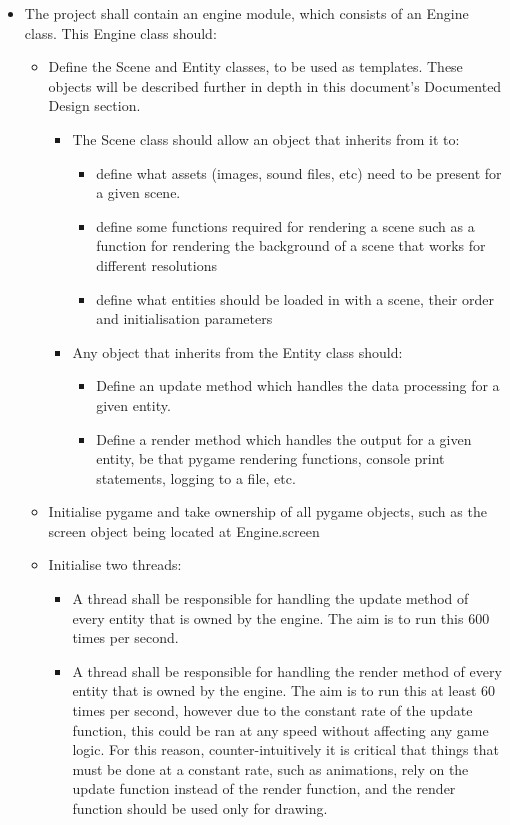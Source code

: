 \documentclass{report}
\begin{document}
\begin{itemize}
    \renewcommand\labelitemi{--}
    \item The project shall contain an engine module, which consists of an Engine class. This Engine class should:
    \begin{itemize}
        \renewcommand\labelitemi{--}
        \item Define the Scene and Entity classes, to be used as templates. These objects will be described further in depth in this document's Documented Design section.
        \begin{itemize}
            \item The Scene class should allow an object that inherits from it to:
            \begin{itemize}
                \item define what assets (images, sound files, etc) need to be present for a given scene.
                \item define some functions required for rendering a scene such as a function for rendering the background of a scene that works for different resolutions
                \item define what entities should be loaded in with a scene, their order and initialisation parameters
            \end{itemize} 
            \item Any object that inherits from the Entity class should:
            \begin{itemize}
                \item Define an update method which handles the data processing for a given entity.
                \item Define a render method which handles the output for a given entity, be that pygame rendering functions, console print statements, logging to a file, etc.
            \end{itemize}
        \end{itemize}
        \item Initialise pygame and take ownership of all pygame objects, such as the screen object being located at Engine.screen
        \item Initialise two threads:
            \begin{itemize}
                \item A thread shall be responsible for handling the update method of every entity that is owned by the engine. The aim is to run this 600 times per second.
                \item A thread shall be responsible for handling the render method of every entity that is owned by the engine. The aim is to run this at least 60 times per second, however due to the constant rate of the update function, this could be ran at any speed without affecting any game logic. For this reason, counter-intuitively it is critical that things that must be done at a constant rate, such as animations, rely on the update function instead of the render function, and the render function should be used only for drawing.

\end{itemize}
\end{itemize}
\end{itemize}
\end{document}
